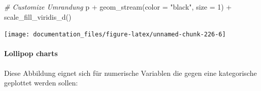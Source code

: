 \documentclass[
]{article}
\newenvironment{Shaded}{\begin{snugshade}}{\end{snugshade}}
\newcommand{\AttributeTok}[1]{\textcolor[rgb]{0.77,0.63,0.00}{#1}}
\newcommand{\CommentTok}[1]{\textcolor[rgb]{0.56,0.35,0.01}{\textit{#1}}}
\newcommand{\DecValTok}[1]{\textcolor[rgb]{0.00,0.00,0.81}{#1}}
\newcommand{\FunctionTok}[1]{\textcolor[rgb]{0.00,0.00,0.00}{#1}}
\newcommand{\NormalTok}[1]{#1}
\newcommand{\SpecialCharTok}[1]{\textcolor[rgb]{0.00,0.00,0.00}{#1}}
\newcommand{\StringTok}[1]{\textcolor[rgb]{0.31,0.60,0.02}{#1}}
\begin{document}
\begin{Shaded}
\begin{Highlighting}[]
\CommentTok{\# Customize Umrandung}
\NormalTok{p }\SpecialCharTok{+} \FunctionTok{geom\_stream}\NormalTok{(}\AttributeTok{color =} \StringTok{"black"}\NormalTok{, }\AttributeTok{size =} \DecValTok{1}\NormalTok{) }\SpecialCharTok{+}
  \FunctionTok{scale\_fill\_viridis\_d}\NormalTok{()}
\end{Highlighting}
\end{Shaded}

\begin{center}\texttt{[image: documentation\_files/figure-latex/unnamed-chunk-226-6]} \end{center}

\hypertarget{lollipop-charts}{%
\paragraph{Lollipop charts}\label{lollipop-charts}}

Diese Abbildung eignet sich für numerische Variablen die gegen eine kategorische geplottet werden sollen:
\end{document}
